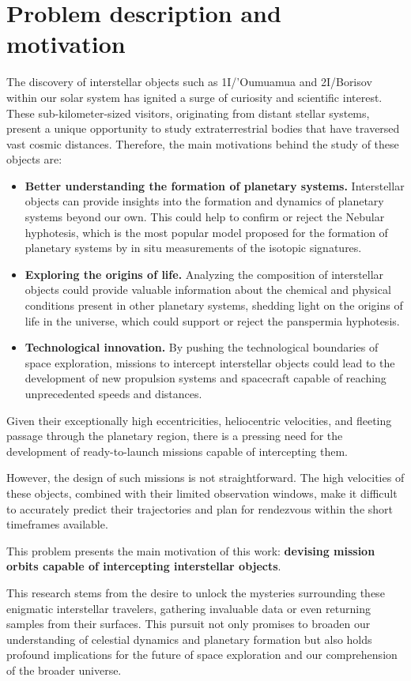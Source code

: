 \section{Problem description and motivation}

The discovery of interstellar objects such as 1I/'Oumuamua and 2I/Borisov within our
solar system has ignited a surge of curiosity and scientific interest. These
sub-kilometer-sized visitors, originating from distant stellar systems, present
a unique opportunity to study extraterrestrial bodies that have traversed vast
cosmic distances. Therefore, the main motivations behind the study of these
objects are:

\begin{itemize}

  \item \textbf{Better understanding the formation of planetary systems.}
        Interstellar objects can provide insights into the formation and
        dynamics of planetary systems beyond our own. This could help to
        confirm or reject the Nebular hyphotesis, which is the most popular
        model proposed for the formation of planetary systems by in situ
        measurements of the isotopic signatures.

  \item \textbf{Exploring the origins of life.} Analyzing the composition of
        interstellar objects could provide valuable information about the
        chemical and physical conditions present in other planetary
        systems, shedding light on the origins of life in the universe, which
        could support or reject the panspermia hyphotesis.

  \item \textbf{Technological innovation.} By pushing the technological
        boundaries of space exploration, missions to intercept interstellar
        objects could lead to the development of new propulsion systems and
        spacecraft capable of reaching unprecedented speeds and distances.

\end{itemize}

Given their exceptionally high eccentricities, heliocentric velocities, and
fleeting passage through the planetary region, there is a pressing need for the
development of ready-to-launch missions capable of intercepting them.

However, the design of such missions is not straightforward. The high velocities
of these objects, combined with their limited observation windows, make it
difficult to accurately predict their trajectories and plan for rendezvous
within the short timeframes available.

This problem presents the main motivation of this work: \textbf{devising mission
  orbits capable of intercepting interstellar objects}.

This research stems from the desire to unlock the mysteries surrounding these
enigmatic interstellar travelers, gathering invaluable data or even returning
samples from their surfaces. This pursuit not only promises to broaden our
understanding of celestial dynamics and planetary formation but also holds
profound implications for the future of space exploration and our comprehension
of the broader universe.
